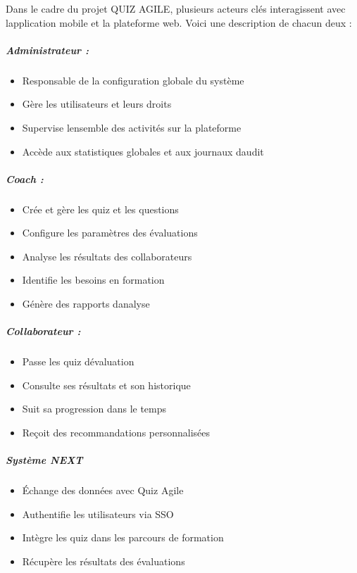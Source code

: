 \documentclass[12pt,a4paper,twoside]{report}
\begin{document}
Dans
le cadre du projet QUIZ AGILE, plusieurs acteurs clés interagissent avec
l\textquotesingle application mobile et la plateforme web. Voici une
description de chacun d\textquotesingle eux :

\hypertarget{administrateur}{%
\subparagraph{Administrateur :}\label{administrateur}}

\begin{itemize}
\item
  Responsable de la configuration globale du système
\item
  Gère les utilisateurs et leurs droits
\item
  Supervise l\textquotesingle ensemble des activités sur la plateforme
\item
  Accède aux statistiques globales et aux journaux
  d\textquotesingle audit
\end{itemize}

\hypertarget{coach}{%
\subparagraph{Coach :}\label{coach}}

\begin{itemize}
\item
  Crée et gère les quiz et les questions
\item
  Configure les paramètres des évaluations
\item
  Analyse les résultats des collaborateurs
\item
  Identifie les besoins en formation
\item
  Génère des rapports d\textquotesingle analyse
\end{itemize}

\hypertarget{collaborateur}{%
\subparagraph{Collaborateur :}\label{collaborateur}}

\begin{itemize}
\item
  Passe les quiz d\textquotesingle évaluation
\item
  Consulte ses résultats et son historique
\item
  Suit sa progression dans le temps
\item
  Reçoit des recommandations personnalisées
\end{itemize}

\hypertarget{systuxe8me-next}{%
\subparagraph{Système NEXT}\label{systuxe8me-next}}

\begin{itemize}
\item
  Échange des données avec Quiz Agile
\item
  Authentifie les utilisateurs via SSO
\item
  Intègre les quiz dans les parcours de formation
\item
  Récupère les résultats des évaluations
\end{itemize}
\end{document}
